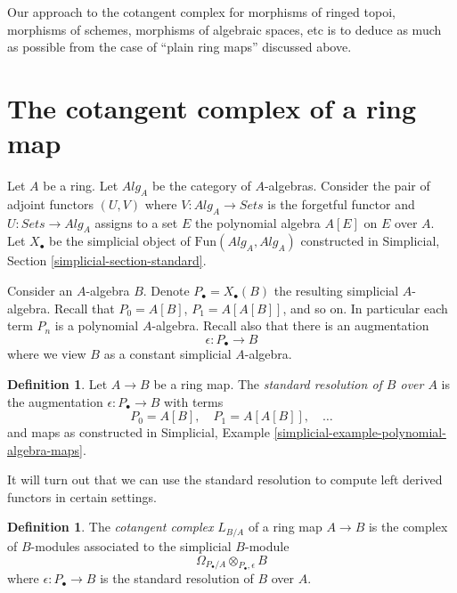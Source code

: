 \documentclass{stacks-project}
\theoremstyle{plain}
\theoremstyle{definition}
\newtheorem{definition}[subsection]{Definition}
\theoremstyle{remark}
\numberwithin{equation}{subsection}
\begin{document}
\medskip\noindent
Our approach to the cotangent complex for morphisms of ringed topoi,
morphisms of schemes, morphisms of algebraic spaces, etc
is to deduce as much as possible from the case of ``plain ring maps''
discussed above.





\section{The cotangent complex of a ring map}
\label{section-cotangent-ring-map}

\noindent
Let $A$ be a ring. Let $\textit{Alg}_A$ be the category of $A$-algebras.
Consider the pair of adjoint functors $(U, V)$ where
$V : \textit{Alg}_A \to \textit{Sets}$ is the forgetful functor and
$U : \textit{Sets} \to \textit{Alg}_A$ assigns to a set $E$ the polynomial
algebra $A[E]$ on $E$ over $A$. Let $X_\bullet$ be the simplicial object of
$\text{Fun}(\textit{Alg}_A, \textit{Alg}_A)$ constructed in
Simplicial, Section \ref{simplicial-section-standard}.

\medskip\noindent
Consider an $A$-algebra $B$. Denote $P_\bullet = X_\bullet(B)$ the resulting
simplicial $A$-algebra. Recall that $P_0 = A[B]$, $P_1 = A[A[B]]$, and so on.
In particular each term $P_n$ is a polynomial $A$-algebra.
Recall also that there is an augmentation
$$
\epsilon : P_\bullet \longrightarrow B
$$
where we view $B$ as a constant simplicial $A$-algebra.

\begin{definition}
\label{definition-standard-resolution}
Let $A \to B$ be a ring map. The {\it standard resolution of $B$ over $A$}
is the augmentation $\epsilon : P_\bullet \to B$ with terms
$$
P_0 = A[B],\quad P_1 = A[A[B]],\quad \ldots
$$
and maps as constructed in
Simplicial, Example \ref{simplicial-example-polynomial-algebra-maps}.
\end{definition}

\noindent
It will turn out that we can use the standard resolution
to compute left derived functors in certain settings.

\begin{definition}
\label{definition-cotangent-complex-ring-map}
The {\it cotangent complex} $L_{B/A}$ of a ring map $A \to B$
is the complex of $B$-modules associated to the simplicial $B$-module
$$
\Omega_{P_\bullet/A} \otimes_{P_\bullet, \epsilon} B
$$
where $\epsilon : P_\bullet \to B$ is the standard resolution
of $B$ over $A$.
\end{definition}
\end{document}
